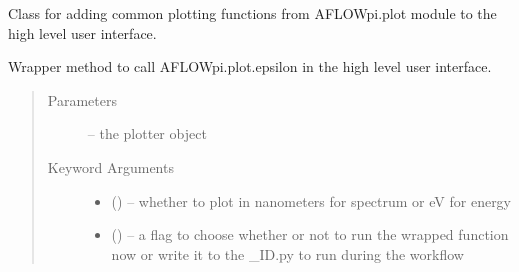 \documentclass[letterpaper,10pt,english]{sphinxmanual}
\begin{document}
\begin{fulllineitems}
\label{\detokenize{prep:prep.tb_plotter}}
Class for adding common plotting functions from AFLOWpi.plot module to the high level user
interface.

\begin{fulllineitems}
\label{\detokenize{prep:prep.tb_plotter.bands}}
\end{fulllineitems}


\begin{fulllineitems}
\label{\detokenize{prep:prep.tb_plotter.dos}}
\end{fulllineitems}


\begin{fulllineitems}
\label{\detokenize{prep:prep.tb_plotter.opdos}}
\end{fulllineitems}


\begin{fulllineitems}
\label{\detokenize{prep:prep.tb_plotter.optical}}
Wrapper method to call AFLOWpi.plot.epsilon in the high level user interface.
\begin{quote}\begin{description}
\item[{Parameters}] \leavevmode
{} -- the plotter object

\item[{Keyword Arguments}] \leavevmode\begin{itemize}
\item {} 
 () -- whether to plot in nanometers for spectrum or eV for energy

\item {} 
 () -- a flag to choose whether or not to run the wrapped function now
or write it to the \_ID.py to run during the workflow


\end{itemize}
\end{description}
\end{quote}
\end{fulllineitems}
\end{fulllineitems}
\end{document}

